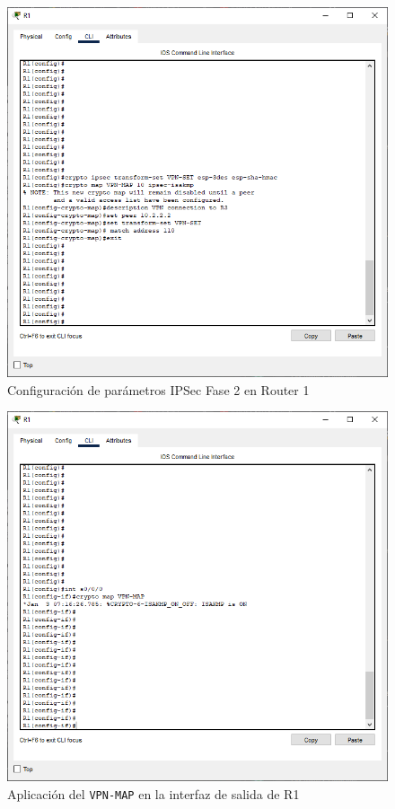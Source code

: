 \documentclass{article}
\begin{document}
        \begin{figure}[!h]
            \centering
            \includegraphics[scale=0.45]{img/task1-step4.png}
            \caption{Configuración de parámetros IPSec Fase 2 en Router 1}
            \label{fig:task1-step4}
        \end{figure}

        \clearpage
        \begin{figure}[!h]
            \centering
            \includegraphics[scale=0.45]{img/task1-step5.png}
            \caption{Aplicación del \texttt{VPN-MAP} en la interfaz de salida de R1}
            \label{fig:task1-step5}
        \end{figure}
\end{document}
